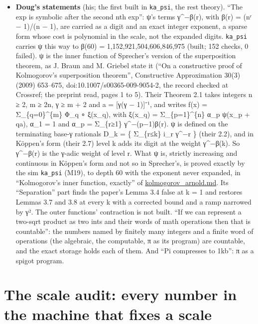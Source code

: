 \begin{itemize}
\item \textbf{Doug's statements} (his; the first built in \texttt{ka\_\allowbreak{}psi}, the rest theory). “The exp is symbolic after the second nth exp”: ψ's terms γ\textasciicircum{}−β(r), with β(r) = (nʳ − 1)/(n − 1), are carried as a digit and an exact integer exponent, a sparse form whose cost is polynomial in the scale, not the expanded digits. \texttt{ka\_\allowbreak{}psi} carries ψ this way to β(60) = 1,152,921,504,606,846,975 (built; 152 checks, 0 failed). ψ is the inner function of Sprecher's version of the superposition theorem, as J. Braun and M. Griebel state it (“On a constructive proof of Kolmogorov's superposition theorem”, Constructive Approximation 30(3) (2009) 653–675, doi:10.1007/s00365-009-9054-2, the record checked at Crossref; the preprint read, pages 1 to 5). Their Theorem 2.1 takes integers n ≥ 2, m ≥ 2n, γ ≥ m + 2 and a = [γ(γ − 1)]⁻¹, and writes f(x) = Σ\_\allowbreak{}\{q=0\}\textasciicircum{}\{m\} Φ\_\allowbreak{}q ∘ ξ(x\_\allowbreak{}q), with ξ(x\_\allowbreak{}q) = Σ\_\allowbreak{}\{p=1\}\textasciicircum{}\{n\} α\_\allowbreak{}p ψ(x\_\allowbreak{}p + qa), α\_\allowbreak{}1 = 1 and α\_\allowbreak{}p = Σ\_\allowbreak{}\{r≥1\} γ\textasciicircum{}−(p−1)β(r). ψ is defined on the terminating base-γ rationals D\_\allowbreak{}k = \{ Σ\_\allowbreak{}\{r≤k\} i\_\allowbreak{}r γ\textasciicircum{}−r \} (their 2.2), and in Köppen's form (their 2.7) level k adds its digit at the weight γ\textasciicircum{}−β(k). So γ\textasciicircum{}−β(r) is the γ-adic weight of level r. What ψ is, strictly increasing and continuous in Köppen's form and not so in Sprecher's, is proved exactly by the sim \texttt{ka\_\allowbreak{}psi} (M19), to depth 60 with the exponent never expanded, in “Kolmogorov's inner function, exactly” of \hyperref[chap:kolmogorov-arnold]{kolmogorov\_\allowbreak{}arnold.md}. Its “Separation” part finds the paper's Lemma 3.4 false at k = 1 and restores Lemmas 3.7 and 3.8 at every k with a corrected bound and a ramp narrowed by γ². The outer functions' contraction is not built. “If we can represent a two-sqrt product as two ints and their words of math operations then that is countable”: the numbers named by finitely many integers and a finite word of operations (the algebraic, the computable, π as its program) are countable, and the exact storage holds each of them. And “Pi compresses to 1kb”: π as a spigot program.
\end{itemize}

\section{\texorpdfstring{The scale audit: every number in the machine that fixes a scale}{The scale audit: every number in the machine that fixes a scale}}

